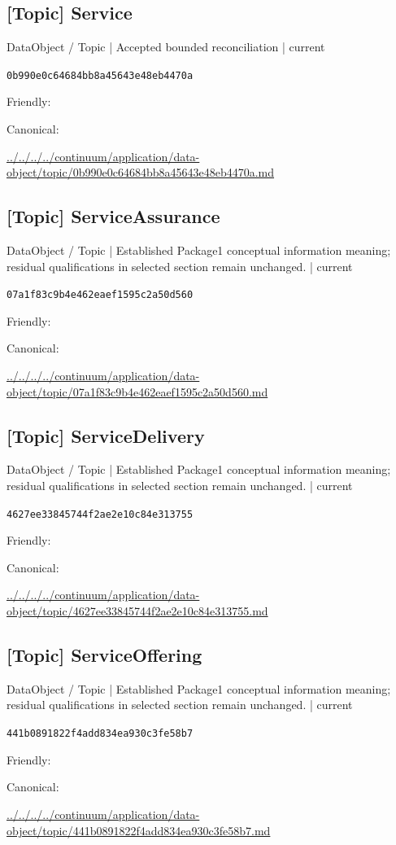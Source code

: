 \documentclass[10pt,a4paper]{article}
\begin{document}
\subsection*{[Topic] Service}
{\small DataObject / Topic | Accepted bounded reconciliation | current}\par
\texttt{0b990e0c64684bb8a45643e48eb4470a}\par
Friendly: \par
Canonical: \par
{\footnotesize\url{../../../../continuum/application/data-object/topic/0b990e0c64684bb8a45643e48eb4470a.md}}\par
\subsection*{[Topic] ServiceAssurance}
{\small DataObject / Topic | Established Package1 conceptual information meaning; residual qualifications in selected section remain unchanged. | current}\par
\texttt{07a1f83c9b4e462eaef1595c2a50d560}\par
Friendly: \par
Canonical: \par
{\footnotesize\url{../../../../continuum/application/data-object/topic/07a1f83c9b4e462eaef1595c2a50d560.md}}\par
\subsection*{[Topic] ServiceDelivery}
{\small DataObject / Topic | Established Package1 conceptual information meaning; residual qualifications in selected section remain unchanged. | current}\par
\texttt{4627ee33845744f2ae2e10c84e313755}\par
Friendly: \par
Canonical: \par
{\footnotesize\url{../../../../continuum/application/data-object/topic/4627ee33845744f2ae2e10c84e313755.md}}\par
\subsection*{[Topic] ServiceOffering}
{\small DataObject / Topic | Established Package1 conceptual information meaning; residual qualifications in selected section remain unchanged. | current}\par
\texttt{441b0891822f4add834ea930c3fe58b7}\par
Friendly: \par
Canonical: \par
{\footnotesize\url{../../../../continuum/application/data-object/topic/441b0891822f4add834ea930c3fe58b7.md}}\par
\end{document}
